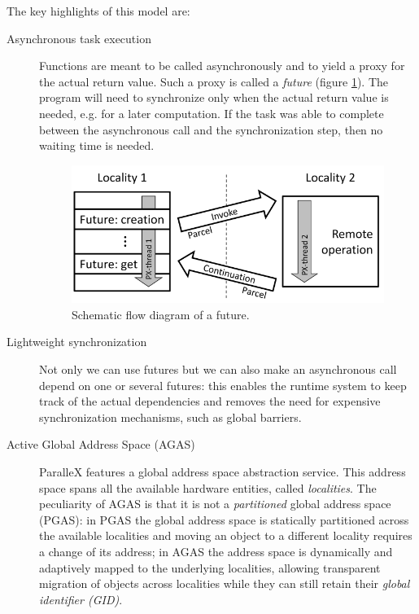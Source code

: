 The key highlights of this model are:
\begin{description}
	\item [Asynchronous task execution] Functions are meant to be called asynchronously and to yield a proxy for the actual return value. Such a proxy is called a \emph{future} (figure \ref{fig:futureFlowDiagram}). The program will need to synchronize only when the actual return value is needed, e.g. for a later computation. If the task was able to complete between the asynchronous call and the synchronization step, then no waiting time is needed.
	\begin{figure}[t]
	 	\begin{center}
	 		\includegraphics[scale=0.3]{Figures/futureFlowDiagram.png}
	 		\caption{Schematic flow diagram of a future\cite{kaiser2009parallex}.}\label{fig:futureFlowDiagram}
	 	\end{center}
	\end{figure}
	\item [Lightweight synchronization] Not only we can use futures but we can also make an asynchronous call depend on one or several futures: this enables the runtime system to keep track of the actual dependencies and removes the need for expensive synchronization mechanisms, such as global barriers.
	\item [Active Global Address Space (AGAS)] ParalleX features a global address space abstraction service. This address space spans all the available hardware entities, called \emph{localities}.
	The peculiarity of AGAS is that it is not a \emph{partitioned} global address space (PGAS): in PGAS the global address space is statically partitioned across the available localities and moving an object to a different locality requires a change of its address; in AGAS the address space is dynamically and adaptively mapped to the underlying localities, allowing transparent migration of objects across localities while they can still retain their \emph{global identifier (GID)}.

\end{description}
